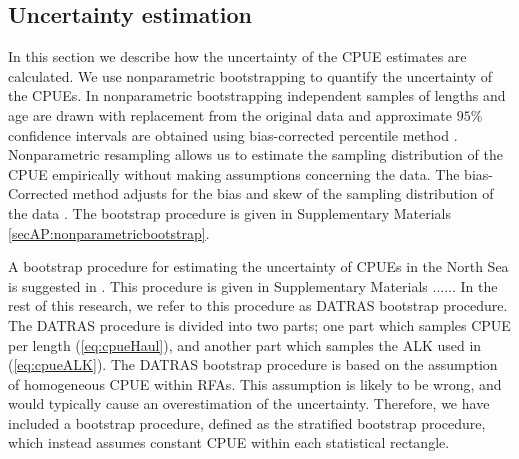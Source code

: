 \documentclass[a4paper 12pt]{article}
\numberwithin{equation}{section}
\begin{document}
\subsection{Uncertainty estimation}
\label{sec:uncertaintyestimation}
In this section we describe how the uncertainty of the CPUE estimates are calculated. We use nonparametric bootstrapping to quantify the uncertainty of the CPUEs. In nonparametric bootstrapping independent samples of lengths and age are drawn with replacement from the original data and approximate $95\%$ confidence intervals are obtained using bias-corrected percentile method  \citep{carpenter2000bootstrap}. Nonparametric resampling allows us to estimate the sampling distribution of the CPUE empirically without making assumptions concerning the data. The bias-Corrected method adjusts for the bias and skew of the sampling distribution of the data \citep{puth2015variety, karlsson2009bootstrap}. The bootstrap procedure is given in Supplementary Materials \ref{secAP:nonparametricbootstrap}.  

A bootstrap procedure for estimating the uncertainty of CPUEs in the North Sea is suggested in \citet{ICES2013}. This procedure is given in Supplementary Materials ...... In the rest of this research, we refer to this procedure as DATRAS bootstrap procedure. The DATRAS procedure is divided into two parts; one part which samples CPUE per length (\ref{eq:cpueHaul}), and another part which samples the ALK used in (\ref{eq:cpueALK}). The DATRAS bootstrap procedure is based on the assumption of homogeneous CPUE within RFAs. This assumption is likely to be wrong, and would typically cause an overestimation of the uncertainty.  Therefore, we have included a bootstrap procedure, defined as the stratified bootstrap procedure, which instead assumes constant CPUE within each statistical rectangle. 
\end{document}
